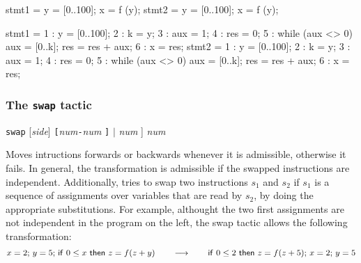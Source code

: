 \begin{minicode}{0.5}

stmt1 = y = [0..100];
        x = f (y);
stmt2 = y = [0..100];
        x = f (y);
\end{minicode}
\begin{minicode}{0.5}

stmt1 =   1 : y = [0..100];
          2 : k = y;
          3 : aux = 1;
          4 : res = 0;
          5 : while (aux <> 0) { 
                aux = [0..k];
                res = res + aux;
              }
          6 : x = res;
stmt2 =   1 : y = [0..100];
          2 : k = y;
          3 : aux = 1;
          4 : res = 0;
          5 : while (aux <> 0) { 
                aux = [0..k];
                res = res + aux;
              }
          6 : x = res;

\end{minicode}



\subsubsection{The \texttt{swap} tactic}\label{tac:swap} \DONE

\Syntax \verb+swap+ [\textit{side}]  \verb+[+\textit{num}\verb+-+\textit{num} \verb+]+ $|$ \textit{num} ]  \textit{num}

\Description Moves intructions forwards or backwards whenever it is
admissible, otherwise it fails. In general, the transformation is
admissible if the swapped instructions are independent. Additionally,
\EasyCrypt tries to swap two instructions $s_1$ and $s_2$ if
$s_1$ is a sequence of assignments over variables that are read by
$s_2$, by doing the appropriate substitutions. For example, althought
the two first assignments are not independent in the program on the
left, the swap tactic allows the following transformation:
\begin{displaymath}
x=2;\, y=5;\, \mathsf{if}\ 0\leq x\ \mathsf{then}\ z=f(z+y) \qquad\longrightarrow\qquad  
\mathsf{if}\ 0\leq 2\ \mathsf{then}\ z=f(z+5);\, x=2;\, y=5
\end{displaymath}

